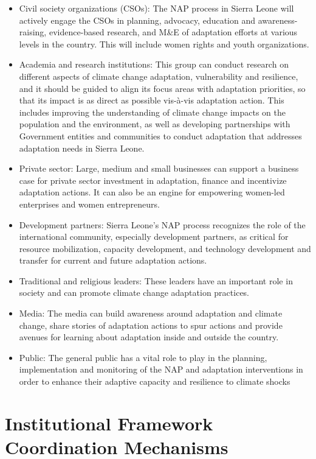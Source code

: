 \documentclass[
]{book}
\begin{document}
\begin{itemize}
\item
  Civil society organizations (CSOs): The NAP process in Sierra Leone will actively engage the CSOs in planning, advocacy, education and awareness-raising, evidence-based research, and M\&E of adaptation efforts at various levels in the country. This will include women rights and youth organizations.
\item
  Academia and research institutions: This group can conduct research on different aspects of climate change adaptation, vulnerability and resilience, and it should be guided to align its focus areas with adaptation priorities, so that its impact is as direct as possible vis-à-vis adaptation action. This includes improving the understanding of climate change impacts on the population and the environment, as well as developing partnerships with Government entities and communities to conduct adaptation that addresses adaptation needs in Sierra Leone.
\item
  Private sector: Large, medium and small businesses can support a business case for private sector investment in adaptation, finance and incentivize adaptation actions. It can also be an engine for empowering women-led enterprises and women entrepreneurs.
\item
  Development partners: Sierra Leone's NAP process recognizes the role of the international community, especially development partners, as critical for resource mobilization, capacity development, and technology development and transfer for current and future adaptation actions.
\item
  Traditional and religious leaders: These leaders have an important role in society and can promote climate change adaptation practices.
\item
  Media: The media can build awareness around adaptation and climate change, share stories of adaptation actions to spur actions and provide avenues for learning about adaptation inside and outside the country.
\item
  Public: The general public has a vital role to play in the planning, implementation and monitoring of the NAP and adaptation interventions in order to enhance their adaptive capacity and resilience to climate shocks
\end{itemize}

\hypertarget{institutional-framework-coordination-mechanisms}{%
\section{Institutional Framework Coordination Mechanisms}\label{institutional-framework-coordination-mechanisms}}
\end{document}
